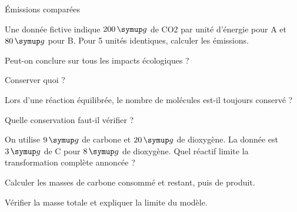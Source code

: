 \par\noindent\begin{minipage}{\linewidth}
\begin{exercice}[3]{Émissions comparées}
\begin{questions}
\item Une donnée fictive indique $200\unite g$ de CO2 par unité d’énergie pour A et $80\unite g$ pour B. Pour 5 unités identiques, calculer les émissions.
\item Peut-on conclure sur tous les impacts écologiques ?
\end{questions}
\end{exercice}
\end{minipage}
\par\noindent\begin{minipage}{\linewidth}
\begin{exercice}[3]{Conserver quoi ?}
\begin{questions}
\item Lors d’une réaction équilibrée, le nombre de molécules est-il toujours conservé ?
\item Quelle conservation faut-il vérifier ?
\end{questions}
\end{exercice}
\end{minipage}
\label{defi-ex-7}
\begin{questions}
\item On utilise $9\unite g$ de carbone et $20\unite g$ de dioxygène. La donnée est $3\unite g$ de C pour $8\unite g$ de dioxygène. Quel réactif limite la transformation complète annoncée ?
\item Calculer les masses de carbone consommé et restant, puis de produit.
\item Vérifier la masse totale et expliquer la limite du modèle.
\end{questions}
\pcGrille
